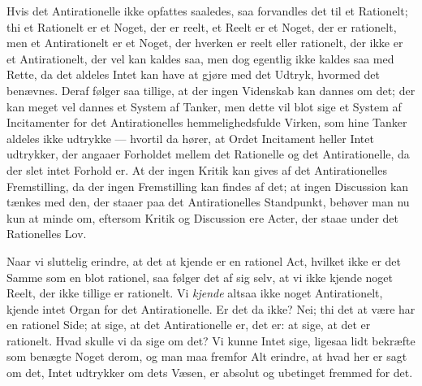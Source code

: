 Hvis det Antirationelle ikke opfattes saaledes, saa forvandles det til et
Rationelt; thi et Rationelt er et Noget, der er reelt, et Reelt er et Noget,
der er
rationelt, men et Antirationelt er et Noget, der hverken er reelt
eller rationelt, der ikke er et Antirationelt, der vel kan kaldes saa, men dog
egentlig ikke kaldes saa med Rette, da det aldeles Intet kan have at gjøre med
det Udtryk, hvormed det benævnes. Deraf følger saa tillige, at der ingen
Videnskab kan dannes om det; der kan meget vel dannes et System af Tanker, men
dette vil blot sige et System af Incitamenter for det Antirationelles
hemmelighedsfulde Virken, som hine Tanker aldeles ikke udtrykke --- hvortil da
hører, at Ordet Incitament heller Intet udtrykker, der angaaer Forholdet mellem
det Rationelle og det Antirationelle, da der slet intet Forhold er. At der
ingen Kritik kan gives af det Antirationelles Fremstilling, da der ingen
Fremstilling kan findes af det; at ingen Discussion kan tænkes med den, der
staaer paa det Antirationelles Standpunkt, behøver man nu kun at minde om,
eftersom Kritik og Discussion ere Acter, der staae under det Rationelles Lov.

Naar vi sluttelig erindre, at det at kjende er en rationel Act, hvilket ikke er
det Samme som en blot rationel, saa følger det af sig selv, at vi ikke kjende
noget Reelt, der ikke tillige er rationelt. Vi \emph{kjende} altsaa ikke noget
Antirationelt, kjende intet Organ for det Antirationelle. Er det da ikke? Nei;
thi det at være har en rationel Side; at sige, at det Antirationelle er, det
er: at sige, at det er rationelt.
Hvad skulle vi da sige om det? Vi kunne Intet sige, ligesaa lidt
bekræfte som benægte Noget derom, og man maa fremfor Alt erindre, at hvad her
er sagt om det, Intet udtrykker om dets Væsen, er absolut og ubetinget fremmed
for det.

